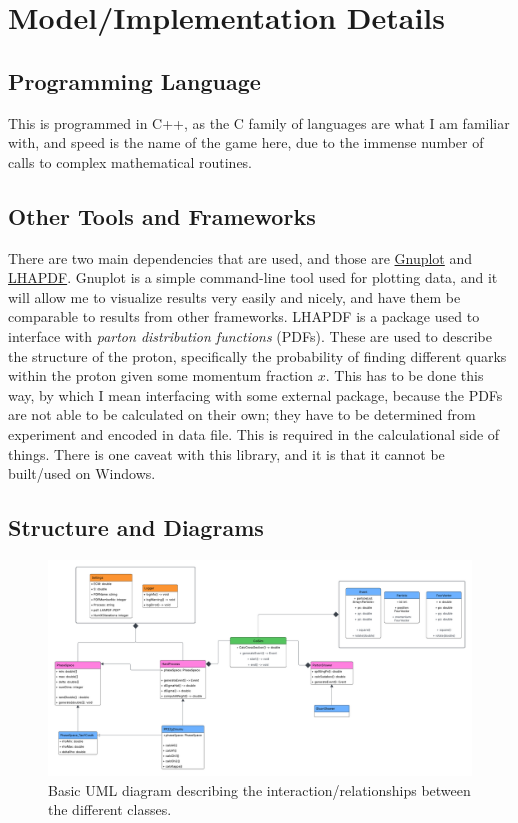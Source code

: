\section{Model/Implementation Details}\label{sec:Model-Implem-Details}

\subsection{Programming Language}

This is programmed in C++, as the C family of languages are what I am familiar with, and speed is the name of the game here, due to the immense number of calls to complex mathematical routines.

\subsection{Other Tools and Frameworks}

There are two main dependencies that are used, and those are \href{http://gnuplot.info/}{Gnuplot} and \href{https://www.lhapdf.org/}{LHAPDF}. Gnuplot is a simple command-line tool used for plotting data, and it will allow me to visualize results very easily and nicely, and have them be comparable to results from other frameworks. \textsc{LHAPDF} is a package used to interface with \textit{parton distribution functions} (PDFs). These are used to describe the structure of the proton, specifically the probability of finding different quarks within the proton given some momentum fraction $x$. This has to be done this way, by which I mean interfacing with some external package, because the PDFs are not able to be calculated on their own; they have to be determined from experiment and encoded in data file. This is required in the calculational side of things. There is one caveat with this library, and it is that it cannot be built/used on Windows.


\subsection{Structure and Diagrams}

\begin{figure}[ht]
  \centering
  \includegraphics[width=0.9\linewidth]{./res/Images/ColSim_Updated.pdf}
  \caption{Basic UML diagram describing the interaction/relationships between the different classes.}
  \label{fig:uml}
\end{figure}


